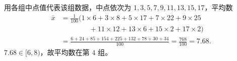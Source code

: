 \begin{answer}
用各组中点值代表该组数据，中点依次为 $1,3,5,7,9,11,13,15,17$，平均数
\nopagebreak[4]
\[\begin{aligned}
\bar x&=\frac{1}{100}\bigl(1\times6+3\times8+5\times17+7\times22+9\times25\\
&\qquad\qquad +11\times12+13\times6+15\times2+17\times2\bigr)\\
&=\frac{6+24+85+154+225+132+78+30+34}{100}=\frac{768}{100}=7.68 .
\end{aligned}\]
$7.68\in[6,8)$，故平均数在第 $4$ 组。



\gkanswer{答案（3）：第 $4$ 组。中点值加权平均得 $\bar x=7.68\in[6,8)$。}

\end{answer}
